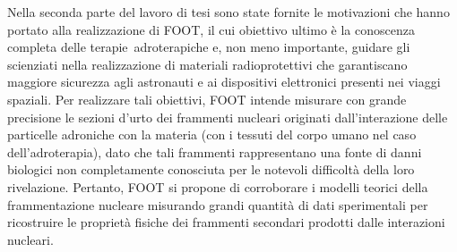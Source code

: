 \documentclass[12pt,a4paper,twoside]{report}
\begin{document}
	Nella seconda parte del lavoro di tesi sono state fornite le motivazioni che hanno portato alla realizzazione di FOOT, il cui obiettivo ultimo è la conoscenza completa delle terapie adroterapiche e, non meno importante, guidare gli scienziati nella realizzazione di materiali radioprotettivi che garantiscano maggiore sicurezza agli astronauti e ai dispositivi elettronici presenti nei viaggi spaziali. Per realizzare tali obiettivi, FOOT intende misurare con grande precisione le sezioni d'urto dei frammenti nucleari originati dall'interazione delle particelle adroniche con la materia (con i tessuti del corpo umano nel caso dell'adroterapia), dato che tali frammenti rappresentano una fonte di danni biologici non completamente conosciuta per le notevoli difficoltà della loro rivelazione. Pertanto, FOOT si propone di corroborare i modelli teorici della frammentazione nucleare misurando grandi quantità di dati sperimentali per ricostruire le proprietà fisiche dei frammenti secondari prodotti dalle interazioni nucleari.
	
\end{document}
